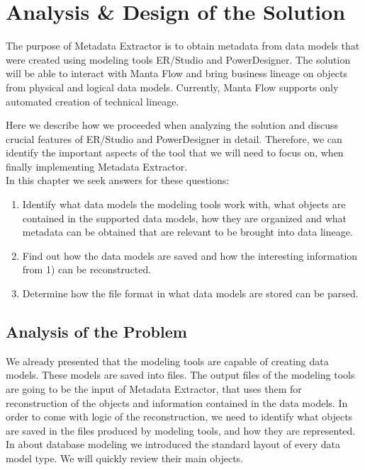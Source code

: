 \chapter{Analysis \& Design of the Solution}
\label{analysis_design}

The purpose of Metadata Extractor is to obtain metadata from data models that were created using modeling tools ER/Studio and PowerDesigner. 
The solution will be able to interact with Manta Flow and bring business lineage on objects from physical and logical data models. 
Currently, Manta Flow supports only automated creation of technical lineage.

Here we describe how we proceeded when analyzing the solution and discuss crucial features of ER/Studio and PowerDesigner in detail.
Therefore, we can identify the important aspects of the tool that we will need to focus on, when finally implementing Metadata Extractor.\\

In this chapter we seek answers for these questions:
\begin{enumerate}
	\item Identify what data models the modeling tools work with, what objects are contained in the supported data models, how they are organized and what metadata can be obtained that are relevant to be brought into data lineage.
	\item Find out how the data models are saved and how the interesting information from 1) can be reconstructed.
	\item Determine how the file format in what data models are stored can be parsed.
\end{enumerate}

\section{Analysis of the Problem}

We already presented that the modeling tools are capable of creating data models. These models are saved into files. 
The output files of the modeling tools are going to be the input of Metadata Extractor, that uses them for reconstruction of the objects and information contained in the data models.
In order to come with logic of the reconstruction, we need to identify what objects are saved in the files produced by modeling tools, and how they are represented. 
In  about database modeling we introduced the standard layout of every data model type. We will quickly review their main objects. \\

